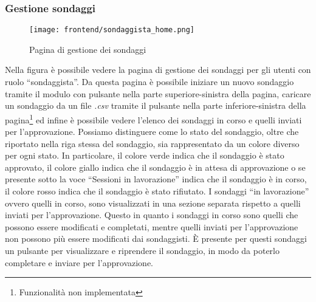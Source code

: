     \subsubsection{Gestione sondaggi}
        \begin{figure}[H]
            \centering
            \texttt{[image: frontend/sondaggista\_home.png]}
            \caption{Pagina di gestione dei sondaggi}
            \label{fig:frontend-sondaggista}
        \end{figure}
        Nella figura  è possibile vedere la pagina di gestione dei sondaggi per gli utenti con ruolo ``sondaggista''. Da questa pagina è possibile iniziare un nuovo sondaggio tramite il modulo con pulsante nella parte superiore-sinistra della pagina, caricare un sondaggio da un file \textit{.csv} tramite il pulsante nella parte inferiore-sinistra della pagina\footnote{Funzionalità non implementata} ed infine è possibile vedere l'elenco dei sondaggi in corso e quelli inviati per l'approvazione. Possiamo distinguere come lo stato del sondaggio, oltre che riportato nella riga stessa del sondaggio, sia rappresentato da un colore diverso per ogni stato. In particolare, il colore verde indica che il sondaggio è stato approvato, il colore giallo indica che il sondaggio è in attesa di approvazione o se presente sotto la voce ``Sessioni in lavorazione'' indica che il sondaggio è in corso, il colore rosso indica che il sondaggio è stato rifiutato.\newline
        I sondaggi ``in lavorazione'' ovvero quelli in corso, sono visualizzati in una sezione separata rispetto a quelli inviati per l'approvazione. Questo in quanto i sondaggi in corso sono quelli che possono essere modificati e completati, mentre quelli inviati per l'approvazione non possono più essere modificati dai sondaggisti. È presente per questi sondaggi un pulsante per visualizzare e riprendere il sondaggio, in modo da poterlo completare e inviare per l'approvazione.
    \newpage
